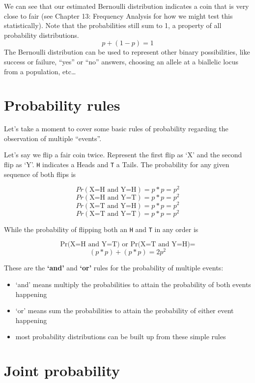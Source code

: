 \documentclass[
]{book}
\providecommand{\tightlist}{%
  \setlength{\itemsep}{0pt}\setlength{\parskip}{0pt}}
\begin{document}
We can see that our estimated Bernoulli distribution indicates a coin that is very close to fair (see Chapter 13: Frequency Analysis for how we might test this statistically). Note that the probabilities still sum to 1, a property of all probability distributions.
\[ p + (1-p) = 1 \]
The Bernoulli distribution can be used to represent other binary possibilities, like success or failure, ``yes'' or ``no'' answers, choosing an allele at a biallelic locus from a population, etc\ldots{}

\hypertarget{probability-rules}{%
\section{Probability rules}\label{probability-rules}}

Let's take a moment to cover some basic rules of probability regarding the observation of multiple ``events''.

Let's say we flip a fair coin twice. Represent the first flip as `X' and the second flip as `Y'. \texttt{H} indicates a Heads and \texttt{T} a Tails. The probability for any given sequence of both flips is

\[ Pr(\text{X=H and Y=H}) = p*p = p^2 \]
\[ Pr(\text{X=H and Y=T}) = p*p = p^2 \]
\[ Pr(\text{X=T and Y=H}) = p*p = p^2 \]
\[ Pr(\text{X=T and Y=T}) = p*p = p^2 \]

While the probability of flipping both an \texttt{H} and \texttt{T} in any order is

\[ \text{Pr(X=H and Y=T) or Pr(X=T and Y=H)} = \]
\[ (p*p) + (p*p) = 2p^{2} \]

These are the \textbf{`and'} and \textbf{`or'} rules for the probability of multiple events:

\begin{itemize}
\tightlist
\item
  `and' means multiply the probabilities to attain the probability of both events happening
\item
  `or' means sum the probabilities to attain the probability of either event happening
\item
  most probability distributions can be built up from these simple rules
\end{itemize}

\hypertarget{joint-probability}{%
\section{Joint probability}\label{joint-probability}}
\end{document}
